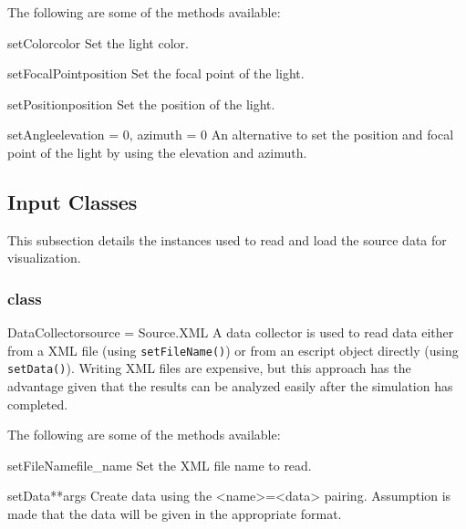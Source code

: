 The following are some of the methods available:
\begin{methoddesc}[Light]{setColor}{color}
Set the light color.
\end{methoddesc}

\begin{methoddesc}[Light]{setFocalPoint}{position}
Set the focal point of the light.
\end{methoddesc}

\begin{methoddesc}[Light]{setPosition}{position}
Set the position of the light.
\end{methoddesc}

\begin{methoddesc}[Light]{setAngle}{elevation = 0, azimuth = 0}
An alternative to set the position and focal point of the light by using the 
elevation and azimuth.
\end{methoddesc}




\subsection{Input Classes}
This subsection details the instances used to read and load the source data
for visualization.

\subsubsection{\DataCollector class}
\label{DATACOLLECTOR SEC}
\begin{classdesc}{DataCollector}{source = Source.XML}
A data collector is used to read data either from a XML file (using 
\texttt{setFileName()}) or from an escript object directly (using 
\texttt{setData()}). Writing XML files are expensive, but this approach has 
the advantage given that the results can be analyzed easily after the 
simulation has completed.   
\end{classdesc}

The following are some of the methods available:
\begin{methoddesc}[DataCollector]{setFileName}{file_name}
Set the XML file name to read.
\end{methoddesc}

\begin{methoddesc}[DataCollector]{setData}{**args}
Create data using the \textless name\textgreater=\textless data\textgreater 
pairing. Assumption is made that the data will be given in the 
appropriate format.
\end{methoddesc}

